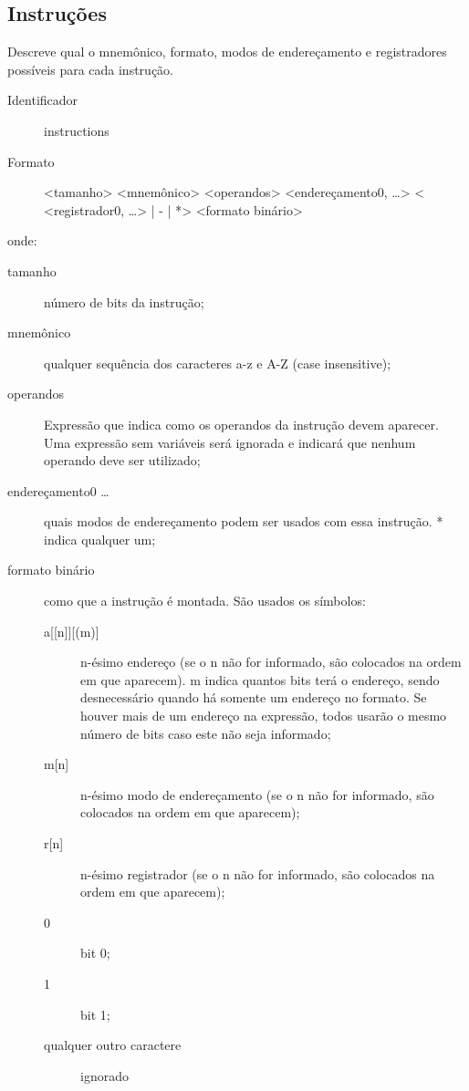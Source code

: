\documentclass[a4paper,10pt]{article}
\begin{document}
		\subsection{Instruções}
		\label{instruções}
		Descreve qual o mnemônico, formato, modos de endereçamento e registradores possíveis para cada instrução.
		
		\begin{description}
		 \item [Identificador] instructions
		 \item [Formato] <tamanho> <mnemônico> <operandos> <endereçamento0, \dots> < <registrador0, \dots> | - | *> <formato binário>
		\end{description}
		onde:
		\begin{description}
		 \item [tamanho] número de bits da instrução;
		 \item [mnemônico] qualquer sequência dos caracteres a-z e A-Z (case insensitive);
		 \item [operandos] Expressão que indica como os operandos da instrução devem aparecer. Uma expressão sem variáveis será ignorada e indicará que nenhum operando deve ser utilizado;
		 \item [endereçamento0 \dots] quais modos de endereçamento podem ser usados com essa instrução. * indica qualquer um;
		 \item [formato binário] como que a instrução é montada. São usados os símbolos:
			\begin{description}
			 \item [a{[[n]][(m)]}] n-ésimo endereço (se o n não for informado, são colocados na ordem em que aparecem). m indica quantos bits terá o endereço, sendo desnecessário quando há somente um endereço no formato. Se houver mais de um endereço na expressão, todos usarão o mesmo número de bits caso este não seja informado;
			 \item [m{[n]}] n-ésimo modo de endereçamento (se o n não for informado, são colocados na ordem em que aparecem);
			 \item [r{[n]}]  n-ésimo registrador (se o n não for informado, são colocados na ordem em que aparecem);
			 \item [0] bit 0;
			 \item [1] bit 1;
			 \item [qualquer outro caractere] ignorado
			\end{description}
		\end{description}
		
\end{document}
